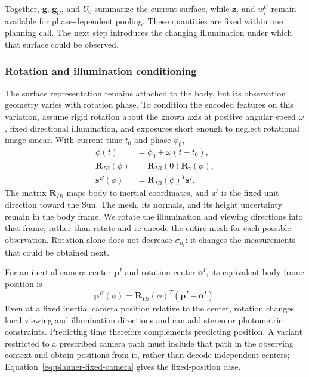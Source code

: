 Together, $\mathbf g$, $\mathbf g_U$, and $U_0$ summarize the current surface, while $\mathbf z_i$ and $w_i^U$ remain available for phase-dependent pooling. These quantities are fixed within one planning call. The next step introduces the changing illumination under which that surface could be observed.

\subsubsection{Rotation and illumination conditioning}
\label{subsubsec:planner-rotation}

The surface representation remains attached to the body, but its observation geometry varies with rotation phase. To condition the encoded features on this variation, assume rigid rotation about the known axis at positive angular speed $\omega$, fixed directional illumination, and exposures short enough to neglect rotational image smear. With current time $t_0$ and phase $\phi_0$,
\begin{equation}
    \begin{aligned}
        \phi(t)&=\phi_0+\omega(t-t_0),\\
        \mathbf R_{IB}(\phi)&=\mathbf R_{IB}(0)\mathbf R_z(\phi),\\
        \mathbf s^B(\phi)&=\mathbf R_{IB}(\phi)^T\mathbf s^I.
    \end{aligned}
    \label{eq:planner-rotating-light}
\end{equation}
The matrix $\mathbf R_{IB}$ maps body to inertial coordinates, and $\mathbf s^I$ is the fixed unit direction toward the Sun. The mesh, its normals, and its height uncertainty remain in the body frame. We rotate the illumination and viewing directions into that frame, rather than rotate and re-encode the entire mesh for each possible observation. Rotation alone does not decrease $\sigma_{h_i}$: it changes the measurements that could be obtained next.

For an inertial camera center $\mathbf p^I$ and rotation center $\mathbf o^I$, its equivalent body-frame position is
\begin{equation}
    \mathbf p^B(\phi)
      =\mathbf R_{IB}(\phi)^T(\mathbf p^I-\mathbf o^I).
    \label{eq:planner-fixed-camera}
\end{equation}
Even at a fixed inertial camera position relative to the center, rotation changes local viewing and illumination directions and can add stereo or photometric constraints. Predicting time therefore complements predicting position. A variant restricted to a prescribed camera path must include that path in the observing context and obtain positions from it, rather than decode independent centers; Equation~\ref{eq:planner-fixed-camera} gives the fixed-position case.

